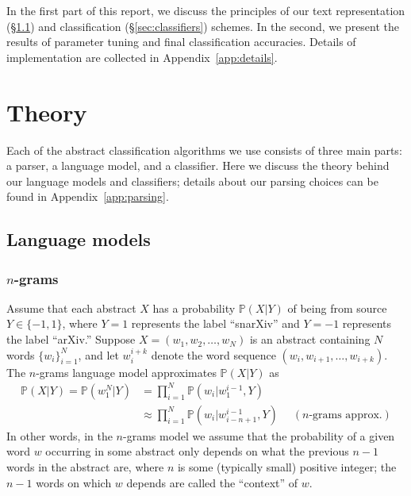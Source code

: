 \documentclass{article}
\renewcommand{\P}{\mathbb{P}}
\begin{document}
In the first part of this report, we discuss the principles of our text representation (\S\ref{sec:LMs}) and classification (\S\ref{sec:classifiers}) schemes.
In the second, we present the results of parameter tuning and final classification accuracies. Details of implementation are collected in Appendix~\ref{app:details}.












\section{Theory}
Each of the abstract classification algorithms we use consists of three main parts: a parser, a language model, and a classifier.
Here we discuss the theory behind our language models and classifiers; details about our parsing choices can be found in Appendix~\ref{app:parsing}.
 
\subsection{Language models} \label{sec:LMs}
\subsubsection{\texorpdfstring{$n$-grams}{n-grams}} \label{sec:n-grams}
Assume that each abstract $X$ has a probability $\P(X|Y)$ of being from source $Y\in\{-1,1\}$, where $Y=1$ represents the label ``snarXiv'' and  $Y=-1$ represents the label ``arXiv.''
Suppose $X=(w_1,w_2,\ldots,w_N)$ is an abstract containing $N$ words $\{w_i\}_{i=1}^N$, and let $w_i^{i+k}$ denote the word sequence $(w_i,w_{i+1},\ldots, w_{i+k})$.
The $n$-grams language model approximates $\P(X|Y)$ as
\begin{align}
  \P(X|Y) = \P(w_1^N|Y) &= \prod_{i=1}^N \P(w_i|w_1^{i-1},Y)
  \\
  &\approx \prod_{i=1}^N \P(w_i| w_{i-n+1}^{i-1},Y) \quad\; (n\text{-grams approx.})
\end{align}
In other words, in the $n$-grams model we assume that the probability of a given word $w$ occurring in some abstract only depends on what the previous $n-1$ words in the abstract are, where $n$ is some (typically small) positive integer; the $n-1$ words on which $w$ depends are called the ``context'' of $w$.
\end{document}
